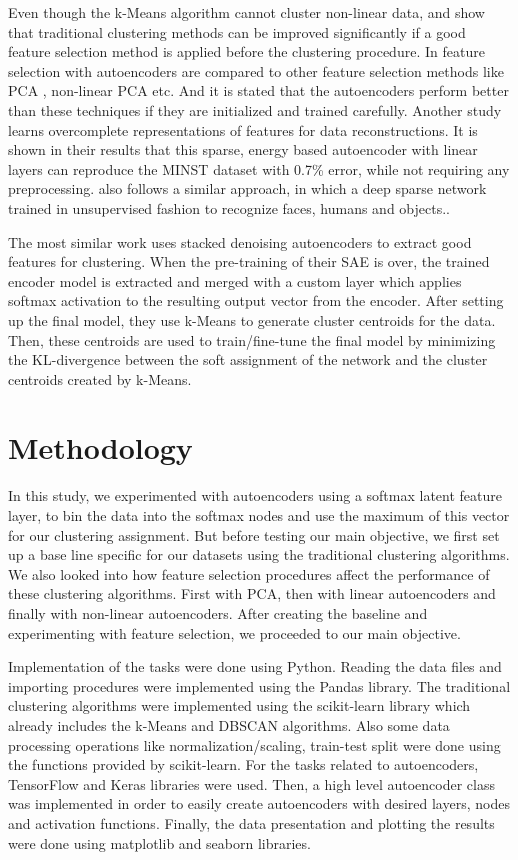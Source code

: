 \documentclass[journal]{IEEEtran}
\begin{document}
Even though the k-Means algorithm cannot cluster non-linear data, \cite{xie2016unsupervised} and \cite{salakhutdinov2007learning} show that traditional clustering methods can be improved significantly if a good feature selection method is applied before the clustering procedure. In \cite{hinton2006reducing} feature selection with autoencoders are compared to other feature selection methods like PCA , non-linear PCA etc. And it is stated that the autoencoders perform better than these techniques if they are initialized and trained carefully. Another study\cite{poultney2007efficient} learns overcomplete representations of features for data reconstructions. It is shown in their results that this sparse, energy based autoencoder with linear layers can reproduce the MINST dataset with 0.7\% error, while not requiring any preprocessing.\cite{le2011building} also follows a similar approach, in which a deep sparse network trained in unsupervised fashion to recognize faces, humans and objects..
  \par
The most similar work \cite{xie2016unsupervised} uses stacked denoising autoencoders to extract good features for clustering. When the pre-training of their SAE is over, the trained encoder model is extracted and merged with a custom layer which applies softmax activation to the resulting output vector from the encoder. After setting up the final model, they use k-Means to generate cluster centroids for the data. Then, these centroids are used to train/fine-tune the final model by minimizing the KL-divergence between the soft assignment of the network and the cluster centroids created by k-Means. 


\section{Methodology}
In this study, we experimented with autoencoders using a softmax latent feature layer, to bin the data into the softmax nodes and use the maximum of this vector for our clustering assignment. But before testing our main objective, we first set up a base line specific for our datasets using the traditional clustering algorithms. We also looked into how feature selection procedures affect the performance of these clustering algorithms. First with PCA, then with linear autoencoders and finally with non-linear autoencoders. After creating the baseline and experimenting with feature selection, we proceeded to our main objective.
\par
Implementation of the tasks were done using Python. Reading the data files and importing procedures were implemented using the Pandas library. The traditional clustering algorithms were implemented using the scikit-learn library which already includes the k-Means and DBSCAN algorithms. Also some data processing operations like normalization/scaling, train-test split were done using the functions provided by scikit-learn. For the tasks related to autoencoders, TensorFlow and Keras libraries were used. Then, a high level autoencoder class was implemented in order to easily create autoencoders with desired layers, nodes and activation functions. Finally, the data presentation and plotting the results were done using matplotlib and seaborn libraries.
\par
\end{document}
